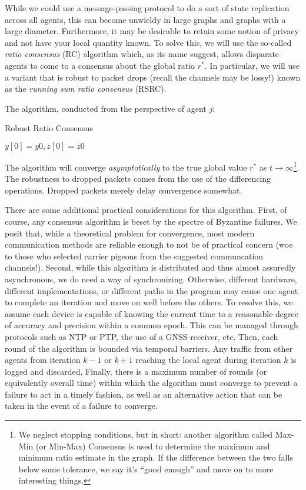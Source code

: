 \documentclass[11pt]{article}
\begin{document}
While we could use a message-passing protocol to do a sort of state replication
across all agents, this can become unwieldy in large graphs and graphs with a
large diameter. Furthermore, it may be desirable to retain some notion of
privacy and not have your local quantity known. To solve this, we will use the
so-called \textit{ratio consensus} (RC) algorithm which, as its name suggest, allows
disparate agents to come to a consensus about the global ratio $r^*$. In
particular, we will use a variant that is robust to packet drops (recall the
channels may be lossy!) known as the \textit{running sum ratio consensus} (RSRC).

The algorithm, conducted from the perspective of agent $j$:
\begin{algorithm}
    \caption{Robust Ratio Consensus}
    \begin{algorithmic}
        \State $y[0] = y0, z[0] = z0$
    \end{algorithmic}
\end{algorithm}

The algorithm will converge \textit{asymptotically} to the true global value
$r^*$ as $t\rightarrow\infty$\footnote{We neglect stopping conditions, but in
    short: another algorithm called Max-Min (or Min-Max) Consensus is used to
    determine the maximum and minimum ratio estimate in the graph. If the difference
    between the two falls below some tolerance, we say it's ``good enough'' and move
    on to more interesting things.}.
The robustness to dropped packets comes from the use of the differencing operations. Dropped packets
merely delay convergence somewhat.

There are some additional practical considerations for this algorithm. First, of
course, any consensus algorithm is beset by the spectre  of Byzantine failures.
We posit that, while a theoretical problem for convergence, most modern
communication methods are reliable enough to not be of practical concern (woe to
those who selected carrier pigeons from the suggested communcation channels!).
Second, while this algorithm is distributed and thus almost assuredly
asynchronous, we do need a way of synchronizing. Otherwise, different hardware,
different implementations, or different paths in the program may cause one agent
to complete an iteration and move on well before the others. To resolve this, we
assume each device is capable of knowing the current time to a reasonable degree
of accuracy and precision within a common epoch. This can be managed through
protocols such as NTP or PTP, the use of a GNSS receiver, etc. Then, each round
of the algorithm is bounded via temporal barriers. Any traffic from other agents
from iteration $k-1$ or $k+1$ reaching the local agent during iteration $k$ is
logged and discarded. Finally, there is a maximum number of rounds (or
equivalently overall time) within which the algorithm must converge to prevent a
failure to act in a timely fashion, as well as an alternative action that can be
taken in the event of a failure to converge.
\end{document}
